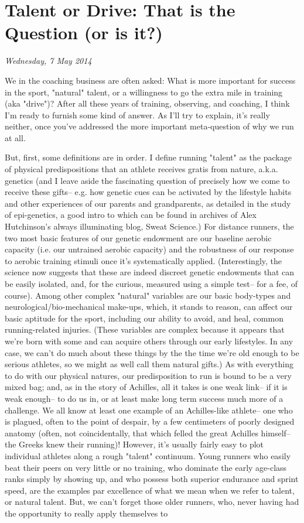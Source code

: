 \chapter{Talent or Drive: That is the Question (or is it?)}
\textit{Wednesday, 7 May 2014}
\bigskip

We in the coaching business are often asked: What is more important for success in the sport, "natural" talent, or a willingness to go the extra mile in training (aka "drive")? After all these years of training, observing, and coaching, I think I'm ready to furnish some kind of answer. As I'll try to explain, it's really neither, once you've addressed the more important meta-question of why we run at all.

But, first, some definitions are in order. I define running "talent" as the package of physical predispositions that an athlete receives gratis from nature, a.k.a. genetics (and I leave aside the fascinating question of precisely how we come to receive these gifts-- e.g. how genetic cues can be activated by the lifestyle habits and other experiences of our parents and grandparents, as detailed in the study of epi-genetics, a good intro to which can be found in archives of Alex Hutchinson's always illuminating blog, Sweat Science.) For distance runners, the two most basic features of our genetic endowment are our baseline aerobic capacity (i.e. our untrained aerobic capacity) and the robustness of our response to aerobic training stimuli once it's systematically applied. (Interestingly, the science now suggests that these are indeed discreet genetic endowments that can be easily isolated, and, for the curious, measured using a simple test-- for a fee, of course). Among other complex "natural" variables are our basic body-types and neurological/bio-mechanical make-ups, which, it stands to reason, can affect our basic aptitude for the sport, including our ability to avoid, and heal, common running-related injuries. (These variables are complex because it appears that we're born with some and can acquire others through our early lifestyles. In any case, we can't do much about these things by the the time we're old enough to be serious athletes, so we might as well call them natural gifts.) As with everything to do with our physical natures, our predisposition to run is bound to be a very mixed bag; and, as in the story of Achilles, all it takes is one weak link-- if it is weak enough-- to do us in, or at least make long term success much more of a challenge. We all know at least one example of an Achilles-like athlete-- one who is plagued, often to the point of despair, by a few centimeters of poorly designed anatomy (often, not coincidentally, that which felled the great Achilles himself-- the Greeks knew their running)! However, it's usually fairly easy to plot individual athletes along a rough "talent" continuum. Young runners who easily beat their peers on very little or no training, who dominate the early age-class ranks simply by showing up, and who possess both superior endurance and sprint speed, are the examples par excellence of what we mean when we refer to talent, or natural talent. But, we can't forget those older runners, who, never having had the opportunity to really apply themselves to 